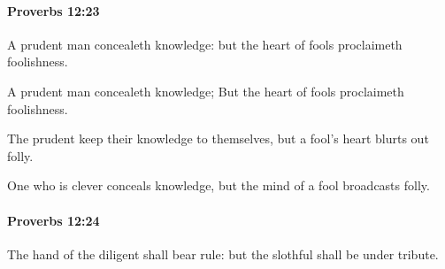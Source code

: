 		\paragraph{Proverbs 12:23} %
			\label{PROVERBS-12-23}

			A prudent man concealeth knowledge: but the heart of fools proclaimeth foolishness.

			\begin{versebox}
					\item[BHS] 
					\item[ASV] A prudent man concealeth knowledge; But the heart of fools proclaimeth foolishness.
					\item[NIV] The prudent keep their knowledge to themselves, but a fool’s heart blurts out folly.
					\item[NRSV] One who is clever conceals knowledge, but the mind of a fool broadcasts folly.
			\end{versebox}

		\paragraph{Proverbs 12:24} %
			\label{PROVERBS-12-24}

			The hand of the diligent shall bear rule: but the slothful shall be under tribute.

